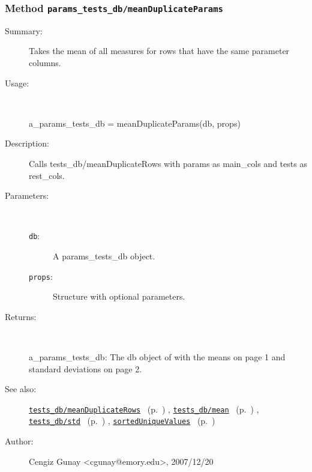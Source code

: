 \subsubsection[Method \texttt{meanDuplicateParams}]{Method \texttt{params\_tests\_db/meanDuplicateParams}}%
%
\label{ref_params_tests_db__meanDuplicateParams}%
\hypertarget{ref_params_tests_db__meanDuplicateParams}{}%
\begin{description}
\item[Summary:]Takes the mean of all measures for rows that have the same parameter columns.
%
\item[Usage:]~%
\begin{lyxcode}%
a\_params\_tests\_db = meanDuplicateParams(db, props)
%
\end{lyxcode}%
%
\item[Description:]%
Calls tests\_db/meanDuplicateRows with params as main\_cols and tests
 as rest\_cols.
\item[Parameters:]~
\begin{description}%
\item[\texttt{db}:]
 A params\_tests\_db object.
\item[\texttt{props}:]
 Structure with optional parameters.
\end{description}%
%
\item[Returns:
]~

	a\_params\_tests\_db: The db object of with the means on page 1 
		    and standard deviations on page 2.
%
%
\item[See also:]%
\hyperlink{ref_tests_db__meanDuplicateRows}{\texttt{tests\_db/meanDuplicateRows}}%
\ (p.~\pageref{ref_tests_db__meanDuplicateRows})%
%
, \hyperlink{ref_tests_db__mean}{\texttt{tests\_db/mean}}%
\ (p.~\pageref{ref_tests_db__mean})%
%
, \hyperlink{ref_tests_db__std}{\texttt{tests\_db/std}}%
\ (p.~\pageref{ref_tests_db__std})%
%
, \hyperlink{ref_sortedUniqueValues}{\texttt{sortedUniqueValues}}%
\ (p.~\pageref{ref_sortedUniqueValues})%
%
%
\item[Author:]%
Cengiz Gunay <cgunay@emory.edu>, 2007/12/20
%
\end{description}
\methodline%

